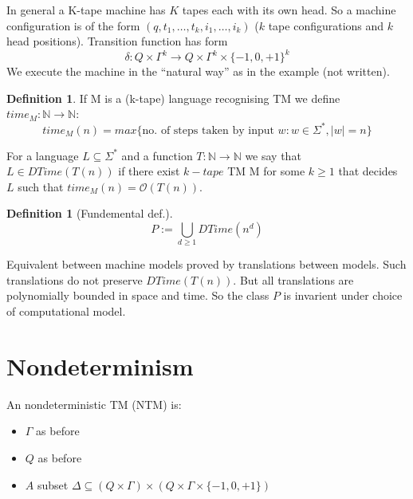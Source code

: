 \documentclass[a4paper,12pt]{article}
\theoremstyle{definition}
\newtheorem{definition}[counter]{Definition}
\theoremstyle{remark}
\newcommand{\N}{\mathbb{N}}
\begin{document}
In general a K-tape machine has $K$ tapes each with its own head. So a machine configuration is of the form 
$(q, t_1, \dots, t_k, i_1, \dots, i_k)$ ($k$ tape configurations and $k$ head positions).
Transition function has form
\begin{equation*}
    \delta: Q \times \Gamma^k \to Q \times \Gamma^k \times \{-1, 0, +1\}^k
\end{equation*}
We execute the machine in the ``natural way'' as in the example (not written).

\begin{definition}
    If M is a (k-tape) language recognising TM we define $time_M: \N \to \N$:
    \begin{equation*}
        time_M(n) = max \{\text{no. of steps taken by input }w: w \in \Sigma^*,  |w| = n\}
    \end{equation*}

    For a language $L \subseteq \Sigma^*$ and a function $T: \N \to \N$ we say that $L \in DTime(T(n))$ if there exist $k-tape$ TM M for
    some $k \geq 1$ that decides $L$ such that $time_M(n) = \mathscr{O}(T(n))$.
\end{definition}

\begin{definition}[Fundemental def.]
    \begin{equation*}
        P := \bigcup\limits_{d \geq 1} DTime(n^d)
    \end{equation*}
\end{definition}

Equivalent between machine models proved by translations between models. Such translations do not preserve $DTime(T(n))$. But 
all translations are polynomially bounded in space and time. So the class $P$ is invarient under choice of computational model.






\newpage
\section{Nondeterminism}
An nondeterministic TM (NTM) is:
\begin{itemize}
    \item $\Gamma$ as before
    \item $Q$ as before
    \item $A$ subset $\Delta \subseteq (Q \times \Gamma) \times (Q \times \Gamma \times \{-1, 0, +1\})$
\end{itemize}
\end{document}
